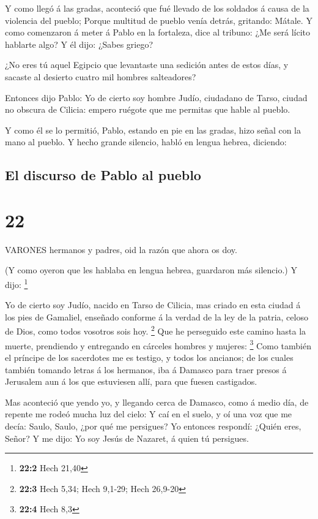  Y como llegó á las gradas, aconteció que fué llevado de
los soldados á causa de la violencia del pueblo;  Porque
multitud de pueblo venía detrás, gritando: Mátale.  Y como
comenzaron á meter á Pablo en la fortaleza, dice al tribuno: ¿Me será
lícito hablarte algo? Y él dijo: ¿Sabes griego?

 ¿No eres tú aquel Egipcio que levantaste una sedición
antes de estos días, y sacaste al desierto cuatro mil hombres
salteadores?

 Entonces dijo Pablo: Yo de cierto soy hombre Judío,
ciudadano de Tarso, ciudad no obscura de Cilicia: empero ruégote que me
permitas que hable al pueblo.

 Y como él se lo permitió, Pablo, estando en pie en las
gradas, hizo señal con la mano al pueblo. Y hecho grande silencio, habló
en lengua hebrea, diciendo:

\hypertarget{el-discurso-de-pablo-al-pueblo}{%
\subsection{El discurso de Pablo al
pueblo}\label{el-discurso-de-pablo-al-pueblo}}

\hypertarget{section-21}{%
\section{22}\label{section-21}}

 VARONES hermanos y padres, oid la razón que ahora os doy.

 (Y como oyeron que les hablaba en lengua hebrea, guardaron
más silencio.) Y dijo: \footnote{\textbf{22:2} Hech 21,40}

 Yo de cierto soy Judío, nacido en Tarso de Cilicia, mas
criado en esta ciudad á los pies de Gamaliel, enseñado conforme á la
verdad de la ley de la patria, celoso de Dios, como todos vosotros sois
hoy. \footnote{\textbf{22:3} Hech 5,34; Hech 9,1-29; Hech 26,9-20}
 Que he perseguido este camino hasta la muerte, prendiendo y
entregando en cárceles hombres y mujeres: \footnote{\textbf{22:4} Hech
  8,3}  Como también el príncipe de los sacerdotes me es
testigo, y todos los ancianos; de los cuales también tomando letras á
los hermanos, iba á Damasco para traer presos á Jerusalem aun á los que
estuviesen allí, para que fuesen castigados.

 Mas aconteció que yendo yo, y llegando cerca de Damasco,
como á medio día, de repente me rodeó mucha luz del cielo: 
Y caí en el suelo, y oí una voz que me decía: Saulo, Saulo, ¿por qué me
persigues?  Yo entonces respondí: ¿Quién eres, Señor? Y me
dijo: Yo soy Jesús de Nazaret, á quien tú persigues.

